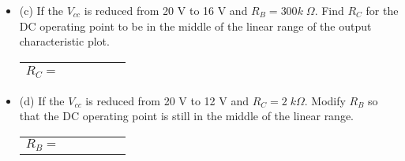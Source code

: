 \begin{itemize}
\item (c) If the $V_{cc}$ is reduced from 20 V to 16 V and $R_B=300k\;\Omega$.
  Find $R_C$ for the DC operating point to be in the middle of the 
  linear range of the output characteristic plot. 
  \begin{tabular}{l} \hline
    $R_C=\;\;\;\;\;\;\;\;\;\;\;\;\;\;\;\;\;$   \\ \hline
  \end{tabular}


\item (d) If the $V_{cc}$ is reduced from 20 V to 12 V and $R_C=2\;k\Omega$.
  Modify $R_B$ so that the DC operating point is still in the middle of the 
  linear range.
  \begin{tabular}{l} \hline
    $R_B=\;\;\;\;\;\;\;\;\;\;\;\;\;\;\;\;\;$    \hline
  \end{tabular}


\end{itemize}


